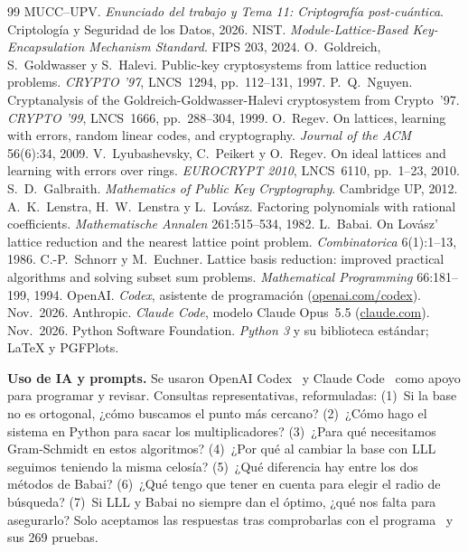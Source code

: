 \renewcommand{\refname}{Referencias y recursos utilizados}
{\setlength{\itemsep}{0pt}
\begin{thebibliography}{99}
\setlength{\itemsep}{0pt}\setlength{\parsep}{0pt}
 MUCC--UPV. \emph{Enunciado del trabajo y Tema 11: Criptografía post-cuántica}.
Criptología y Seguridad de los Datos, 2026.
 NIST. \emph{Module-Lattice-Based Key-Encapsulation Mechanism Standard}. FIPS 203, 2024.
 O.~Goldreich, S.~Goldwasser y S.~Halevi. Public-key cryptosystems from lattice
reduction problems. \emph{CRYPTO '97}, LNCS~1294, pp.~112--131, 1997.
 P.~Q.~Nguyen. Cryptanalysis of the Goldreich-Goldwasser-Halevi cryptosystem from
Crypto~'97. \emph{CRYPTO '99}, LNCS~1666, pp.~288--304, 1999.
 O.~Regev. On lattices, learning with errors, random linear codes, and
cryptography. \emph{Journal of the ACM} 56(6):34, 2009.
 V.~Lyubashevsky, C.~Peikert y O.~Regev. On ideal lattices and learning with errors
over rings. \emph{EUROCRYPT 2010}, LNCS~6110, pp.~1--23, 2010.
 S.~D.~Galbraith. \emph{Mathematics of Public Key Cryptography}. Cambridge UP,
2012.
 A.~K.~Lenstra, H.~W.~Lenstra y L.~Lovász. Factoring polynomials with rational
coefficients. \emph{Mathematische Annalen} 261:515--534, 1982.
 L.~Babai. On Lovász' lattice reduction and the nearest lattice point problem.
\emph{Combinatorica} 6(1):1--13, 1986.
 C.-P.~Schnorr y M.~Euchner. Lattice basis reduction: improved practical algorithms
and solving subset sum problems. \emph{Mathematical Programming} 66:181--199, 1994.
 OpenAI. \emph{Codex}, asistente de programación (\url{openai.com/codex}). Nov.~2026.
 Anthropic. \emph{Claude Code}, modelo Claude Opus~5.5 (\url{claude.com}). Nov.~2026.
 Python Software Foundation. \emph{Python 3} y su biblioteca estándar; LaTeX y PGFPlots.
\end{thebibliography}}

\noindent\textbf{Uso de IA y prompts.} Se usaron OpenAI Codex~\cite{ia} y Claude Code~\cite{claude}
como apoyo para programar y revisar. Consultas representativas, reformuladas:
(1)~Si la base no es ortogonal, ¿cómo buscamos el punto más cercano? (2)~¿Cómo hago el sistema en
Python para sacar los multiplicadores? (3)~¿Para qué necesitamos Gram-Schmidt en estos algoritmos?
(4)~¿Por qué al cambiar la base con LLL seguimos teniendo la misma celosía? (5)~¿Qué diferencia hay
entre los dos métodos de Babai? (6)~¿Qué tengo que tener en cuenta para elegir el radio de búsqueda?
(7)~Si LLL y Babai no siempre dan el óptimo, ¿qué nos falta para asegurarlo? Solo aceptamos
las respuestas tras comprobarlas con el programa~\cite{python} y sus 269 pruebas.
